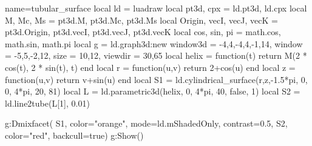 \documentclass[border=5pt]{standalone}%
\begin{document}
\begin{luadraw}{name=tubular_surface}
    local ld = luadraw
    local pt3d, cpx = ld.pt3d, ld.cpx
    local M, Mc, Ms = pt3d.M, pt3d.Mc, pt3d.Ms
    local Origin, vecI, vecJ, vecK = pt3d.Origin, pt3d.vecI, pt3d.vecJ, pt3d.vecK
    local cos, sin, pi = math.cos, math.sin, math.pi
    local g = ld.graph3d:new{
        window3d = {-4,4,-4,4,-1,14}, window = {-5,5,-2,12},
        size = {10,12}, viewdir = {30,65}
    }
    local helix = function(t)
        return M(2 * cos(t), 2 * sin(t), t)
    end
    local r = function(u,v) return 2+cos(u) end
    local z = function(u,v) return v+sin(u) end
    local S1 = ld.cylindrical_surface(r,z,-1.5*pi, 0, 0, 4*pi, {20, 81})
    local L = ld.parametric3d(helix, 0, 4*pi, 40, false, 1)
    local S2 = ld.line2tube(L[1], 0.01)
    
    g:Dmixfacet(
        S1, {color="orange", mode=ld.mShadedOnly, contrast=0.5},
        S2, {color="red", backcull=true})
    g:Show()
\end{luadraw}
\end{document}
